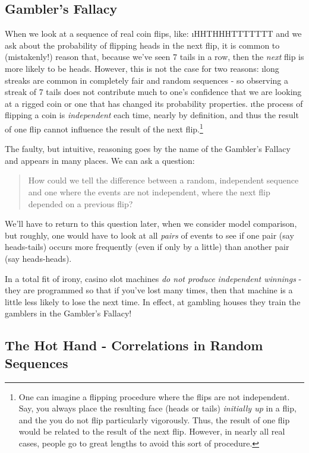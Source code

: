 \subsection{Gambler's Fallacy}

When we look at a sequence of real coin flips, like:
\bi
\i HHTHHHTTTTTTT
\ei
and we ask about the probability of flipping heads in the next flip, it is common to (mistakenly!) reason that, because we've seen 7 tails in a row, then the {\em next} flip is more likely to be heads.  However, this is not the case for two reasons:
\be
\i long streaks are common in completely fair and random sequences - so observing a streak of 7 tails does not contribute much to one's confidence that we are looking at a rigged coin or one that has changed its probability properties.
\i the process of flipping a coin is {\em independent} each time, nearly by definition, and thus the result of one flip cannot influence the result of the next flip.\footnote{One can imagine a flipping procedure where the flips are not independent.  Say, you always place the resulting face (heads or tails) {\em initially up} in a flip, and the you do not flip particularly vigorously.  Thus, the result of one flip would be related to the result of the next flip.  However, in nearly all real cases, people go to great lengths to avoid this sort of procedure.}
\ee

The faulty, but intuitive, reasoning goes by the name of the Gambler's Fallacy and appears in many places.  We can ask a question:\begin{quote}
How could we tell the difference between a random, independent sequence and one where the events are not independent, where the next flip depended on a previous flip?
\end{quote}
We'll have to return to this question later, when we consider model comparison, but roughly, one would have to look at all {\em pairs} of events to see if one pair (say heads-tails) occurs more frequently (even if only by a little) than another pair (say heads-heads).  

In a total fit of irony, casino slot machines \emph{do not produce independent winnings} - they are programmed so that if you've lost many times, then that machine is a little less likely to lose the next time.  In effect, at gambling houses they train the gamblers in the Gambler's Fallacy!


\subsection{The Hot Hand - Correlations in Random Sequences}

